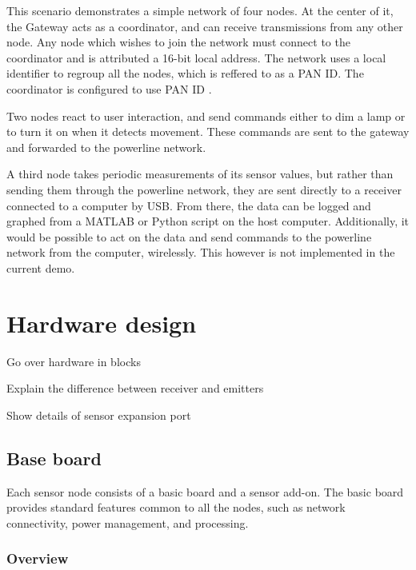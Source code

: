 This scenario demonstrates a simple network of four nodes. At the center of it,
the Gateway acts as a coordinator, and can receive transmissions from any other
node. Any node which wishes to join the network must connect to the coordinator
and is attributed a 16-bit local address. The network uses a local identifier to
regroup all the nodes, which is reffered to as a PAN ID. The coordinator is
configured to use PAN ID .

Two nodes react to user interaction, and send commands either to dim a lamp or
to turn it on when it detects movement. These commands are sent to the gateway
and forwarded to the powerline network.

A third node takes periodic measurements of its sensor values, but rather than
sending them through the powerline network, they are sent directly to a receiver
connected to a computer by USB. From there, the data can be logged and graphed
from a MATLAB or Python script on the host computer. Additionally, it would be
possible to act on the data and send commands to the powerline network from the
computer, wirelessly. This however is not implemented in the current demo.


\section{Hardware design}

Go over hardware in blocks

Explain the difference between receiver and emitters

Show details of sensor expansion port


\subsection{Base board}

Each sensor node consists of a basic board and a sensor add-on. The basic board
provides standard features common to all the nodes, such as network
connectivity, power management, and processing.

\subsubsection{Overview}

